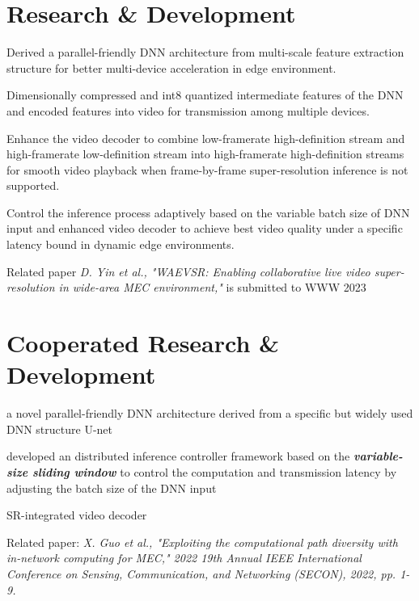 \documentclass[]{deedy-resume-openfont}
\begin{document}
\begin{minipage}[t]{0.76\textwidth} 


\section{Research \& Development}
\vspace{\topsep}
\begin{tightemize}
    \item Derived a parallel-friendly DNN architecture from multi-scale feature extraction structure for better multi-device acceleration in edge environment. %
    \item Dimensionally compressed and int8 quantized intermediate features of the DNN and encoded features into video for transmission among multiple devices. %
    \item Enhance the video decoder to combine low-framerate high-definition stream and high-framerate low-definition stream into high-framerate high-definition streams for smooth video playback when frame-by-frame super-resolution inference is not supported. %
    \item Control the inference process adaptively based on the variable batch size of DNN input and enhanced video decoder to achieve best video quality under a specific latency bound in dynamic edge environments.
    \item Related paper \textit{D. Yin et al., "WAEVSR: Enabling collaborative live video super-resolution in wide-area MEC environment,"} is submitted to WWW 2023
\end{tightemize}
\sectionsep


\section{Cooperated Research \& Development}
\descript{}
\begin{tightemize}
    \item a novel parallel-friendly DNN architecture derived from a specific but widely used DNN structure U-net
    \item developed an distributed inference controller framework based on the \emph{\bfseries variable-size sliding window} to control the computation and transmission latency by adjusting the batch size of the DNN input
    \item SR-integrated video decoder
    \item Related paper: \textit{X. Guo et al., "Exploiting the computational path diversity with in-network computing for MEC," 2022 19th Annual IEEE International Conference on Sensing, Communication, and Networking (SECON), 2022, pp. 1-9.}
\end{tightemize}
\sectionsep


\end{minipage}
\end{document}
